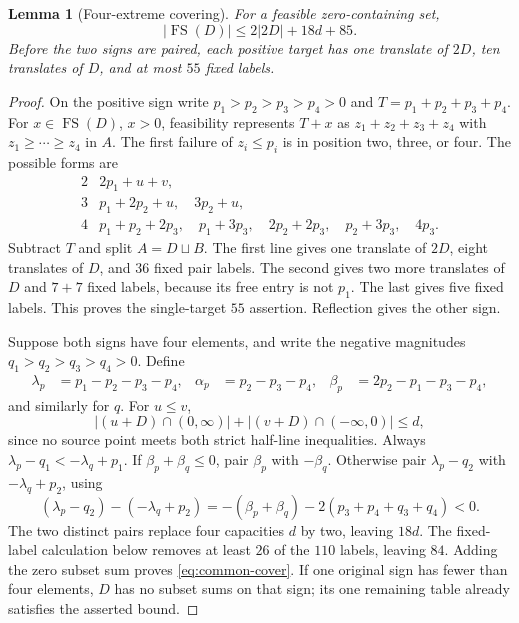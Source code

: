 \documentclass[11pt,letterpaper]{article}
\newcommand{\FS}{\operatorname{FS}}
\newcommand{\card}[1]{\lvert#1\rvert}
\newtheorem{lemma}[theorem]{Lemma}
\theoremstyle{definition}\newtheorem{definition}[theorem]{Definition}
\begin{document}
\begin{lemma}[Four-extreme covering]\label{lem:common-cover}
For a feasible zero-containing set,
\begin{equation}\label{eq:common-cover}
\card{\FS(D)}\le2\card{2D}+18d+85.
\end{equation}
Before the two signs are paired, each positive target has one translate
of $2D$, ten translates of $D$, and at most $55$ fixed labels.
\end{lemma}
\begin{proof}
On the positive sign write $p_1>p_2>p_3>p_4>0$ and $T=p_1+p_2+p_3+p_4$.
For $x\in\FS(D)$, $x>0$, feasibility represents $T+x$ as
$z_1+z_2+z_3+z_4$ with $z_1\ge\cdots\ge z_4$ in $A$.
The first failure of $z_i\le p_i$ is in position two, three, or four.
The possible forms are
\[
\begin{array}{c|l}
2&2p_1+u+v,\\
3&p_1+2p_2+u,\quad3p_2+u,\\
4&p_1+p_2+2p_3,\quad p_1+3p_3,\quad2p_2+2p_3,
\quad p_2+3p_3,\quad4p_3.
\end{array}
\]
Subtract $T$ and split $A=D\sqcup B$. The first line gives one translate
of $2D$, eight translates of $D$, and $36$ fixed pair labels. The second
gives two more translates of $D$ and $7+7$ fixed labels, because its free
entry is not $p_1$. The last gives five fixed labels. This proves the
single-target $55$ assertion. Reflection gives the other sign.

Suppose both signs have four elements, and write the negative magnitudes
$q_1>q_2>q_3>q_4>0$. Define
\[
\begin{aligned}
\lambda_p&=p_1-p_2-p_3-p_4,&\alpha_p&=p_2-p_3-p_4,
&\beta_p&=2p_2-p_1-p_3-p_4,
\end{aligned}
\]
and similarly for $q$. For $u\le v$,
\[
\card{(u+D)\cap(0,\infty)}+
\card{(v+D)\cap(-\infty,0)}\le d,
\]
since no source point meets both strict half-line inequalities.
Always $\lambda_p-q_1<-\lambda_q+p_1$. If
$\beta_p+\beta_q\le0$, pair $\beta_p$ with $-\beta_q$.
Otherwise pair $\lambda_p-q_2$ with $-\lambda_q+p_2$, using
\[
(\lambda_p-q_2)-(-\lambda_q+p_2)
=-(\beta_p+\beta_q)-2(p_3+p_4+q_3+q_4)<0.
\]
The two distinct pairs replace four capacities $d$ by two, leaving
$18d$. The fixed-label calculation below removes at least $26$ of the
$110$ labels, leaving $84$. Adding the zero subset sum proves
\eqref{eq:common-cover}. If one original sign has fewer than four
elements, $D$ has no subset sums on that sign; its one remaining table
already satisfies the asserted bound.
\end{proof}
\end{document}
